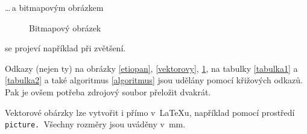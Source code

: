 \documentclass[a4paper,11pt]{article}
\begin{document}
\noindent\ldots\,a bitmapovým obrázkem
\begin{figure}[ht]
  \begin{center}
    \caption{Bitmapový obrázek}
    \label{bitmapovy}
  \end{center}
\end{figure}

se projeví například při zvětšení.

Odkazy (nejen ty) na obrázky \ref{etiopan}, \ref{vektorovy}, \ref{bitmapovy}, na tabulky \ref{tabulka1} a \ref{tabulka2}
a také algoritmus \ref{algoritmus} jsou udělány pomocí křižových odkazů.
Pak je ovšem potřeba zdrojový soubor přeložit dvakrát.

Vektorové obárzky lze vytvořit i přímo v~{\LaTeX}u, například pomocí prostředí\,\,\texttt{picture. }Všechny rozměry jsou uváděny v~mm.




\newpage
\end{document}
